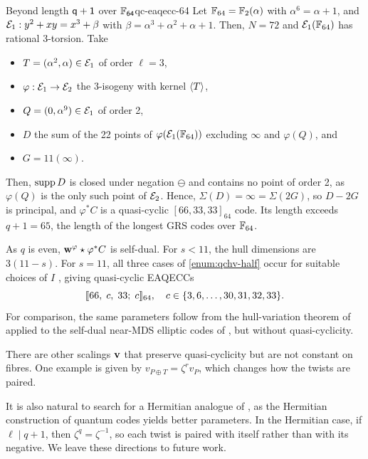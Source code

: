 \documentclass[twocolumn, 11pt]{scrartcl}
\begin{document}
\begin{example}{Beyond length $\sf{q+1}$ over $\sf{\bbF_{64}}$}{qc-eaqecc-64}
Let $\bbF_{64}=\bbF_2(\alpha)$ with $\alpha^6=\alpha+1$, and $\mcE_1:y^2+xy=x^3+\beta$ with $\beta=\alpha^3+\alpha^2+\alpha+1$. Then, $N=72$ and $\mcE_1(\bbF_{64})$ has rational 3-torsion. Take
\begin{itemize}
    \item $T=(\alpha^2,\alpha)\in\mcE_1$ of order $\ell=3$,
    \item $\varphi:\mcE_1\to\mcE_2$ the 3-isogeny with kernel $\ang T$,
    \item $Q=(0,\alpha^9)\in\mcE_1$ of order 2,
    \item $D$ the sum of the 22 points of $\varphi(\mcE_1(\bbF_{64}))$ excluding $\infty$ and $\varphi(Q)$, and
    \item $G=11(\infty)$.
\end{itemize}
Then, $\supp D$ is closed under negation $\ominus$ and contains no point of order 2, as $\varphi(Q)$ is the only such point of $\mcE_2$. Hence, $\Sigma(D)=\infty=\Sigma(2G)$, so $D-2G$ is principal, and $\varphi^*C$ is a quasi-cyclic $[66,33,33]_{64}$ code. Its length exceeds $q+1=65$, the length of the longest GRS codes over $\bbF_{64}$.

As $q$ is even, $\bfw^\varphi\star \varphi^*C$ is self-dual. For $s<11$, the hull dimensions are $3(11-s)$. For $s=11$, all three cases of \ref{enum:qchv-half} occur for suitable choices of $I$ \cite{code-f64}, giving quasi-cyclic EAQECCs
\[ \llbracket66,\;c,\;33;\;c\rrbracket_{64},\quad c\in\set{3,6,\hdots,30,31,32,33}. \]
For comparison, the same parameters follow from the hull-variation theorem of \cite{chen2023hullvariation} applied to the self-dual near-MDS elliptic codes of \cite{jin2019selfdual}, but without quasi-cyclicity.
\end{example}

\begin{remark}{}{}
There are other scalings $\bfv$ that preserve quasi-cyclicity but are not constant on fibres. One example is given by $v_{P\oplus T}=\zeta^r v_P$, which changes how the twists are paired.

It is also natural to search for a Hermitian analogue of , as the Hermitian construction of quantum codes yields better parameters. In the Hermitian case, if $\ell\mid q+1$, then $\zeta^q=\zeta^{-1}$, so each twist is paired with itself rather than with its negative. We leave these directions to future work.
\end{remark}
\end{document}
